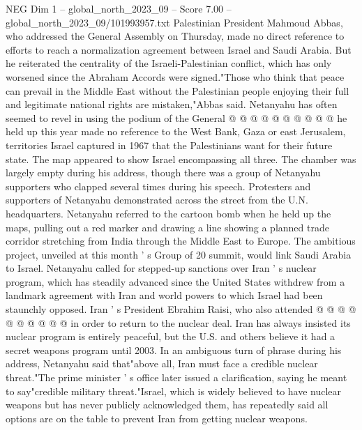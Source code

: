 \begin{textsample}{NEG Dim 1 – global\_north\_2023\_09 – Score 7.00 – global\_north\_2023\_09/101993957.txt}
Palestinian President Mahmoud Abbas, who addressed the General Assembly on Thursday, made no direct reference to efforts to reach a normalization agreement between Israel and Saudi Arabia.
But he reiterated the centrality of the Israeli-Palestinian conflict, which has only worsened since the Abraham Accords were signed."Those who think that peace can prevail in the Middle East without the Palestinian people enjoying their full and legitimate national rights are mistaken,"Abbas said.
Netanyahu has often seemed to revel in using the podium of the General @ @ @ @ @ @ @ @ @ @ he held up this year made no reference to the West Bank, Gaza or east Jerusalem, territories Israel captured in 1967 that the Palestinians want for their future state.
The map appeared to show Israel encompassing all three.
The chamber was largely empty during his address, though there was a group of Netanyahu supporters who clapped several times during his speech.
Protesters and supporters of Netanyahu demonstrated across the street from the U.N. headquarters.
Netanyahu referred to the cartoon bomb when he held up the maps, pulling out a red marker and drawing a line showing a planned trade corridor stretching from India through the Middle East to Europe.
The ambitious project, unveiled at this month ' s Group of 20 summit, would link Saudi Arabia to Israel.
Netanyahu called for stepped-up sanctions over Iran ' s nuclear program, which has steadily advanced since the United States withdrew from a landmark agreement with Iran and world powers to which Israel had been staunchly opposed.
Iran ' s President Ebrahim Raisi, who also attended @ @ @ @ @ @ @ @ @ @ in order to return to the nuclear deal.
Iran has always insisted its nuclear program is entirely peaceful, but the U.S. and others believe it had a secret weapons program until 2003.
In an ambiguous turn of phrase during his address, Netanyahu said that"above all, Iran must face a credible nuclear threat."The prime minister ' s office later issued a clarification, saying he meant to say"credible military threat."Israel, which is widely believed to have nuclear weapons but has never publicly acknowledged them, has repeatedly said all options are on the table to prevent Iran from getting nuclear weapons.

\end{textsample}
